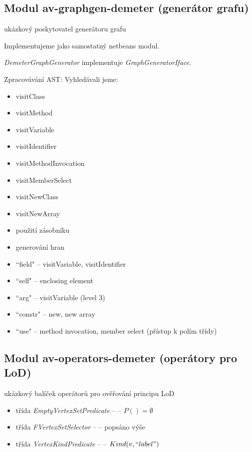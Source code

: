 \subsection{Modul av-graphgen-demeter (generátor grafu)}
ukázkový poskytovatel generátoru grafu

Implementujeme jako samostatný netbeans modul.

\emph{DemeterGraphGenerator} implementuje \emph{GraphGeneratorIface}.

Zpracovávání AST:
Vyhledávali jsme:
\begin{itemize}
\item visitClass
\item visitMethod
\item visitVariable
\item visitIdentifier
\item visitMethodInvocation
\item visitMemberSelect
\item visitNewClass
\item visitNewArray
\end{itemize}

\begin{itemize}
\item použití zásobníku
\item generování hran
\end{itemize}

\begin{itemize}
\item ``field" -- visitVariable, visitIdentifier
\item ``self" -- enclosing element
\item ``arg" -- visitVariable (level 3)
\item ``constr" -- new, new array
\item ``use" -- method invocation, member select (přístup k polím třídy)
\end{itemize}

\subsection{Modul av-operators-demeter (operátory pro LoD)}
ukázkový balíček operátorů pro ověřování principu LoD

\begin{itemize}
\item třída \emph{EmptyVertexSetPredicate} --  -- $P() = \emptyset$
\item třída \emph{FVertexSetSelector} --  -- popsáno výše
\item třída \emph{VertexKindPredicate} --  -- $Kind(v, ``label")$
\end{itemize}

